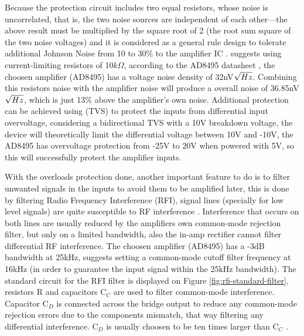 	Because the protection circuit includes two equal resistors, whose noise is uncorrelated, that is, the two noise sources are independent of each other—the above result must be multiplied by the square root of 2 (the root sum square of the two noise voltages) and it is considered as a general rule design to tolerate additional Johnson Noise from 10 to 30$\%$ to the amplifier IC \cite{sensors2000}. \cite{two-ways-thermocouple} suggests using current-limiting resistors of 10$k\Omega$, according to the AD8495 datasheet \cite{ad8495-datasheet}, the choosen amplifier (AD8495) has a voltage noise density of 32nV$\/ \sqrt{Hz}$. Combining this resistors noise with the amplifier noise will produce a overall noise of 36.85nV$\/\sqrt{Hz}$, which is just 13$\%$ above the amplifier's own noise. Additional protection can be achieved using (TVS) to protect the inputs from differential input overvoltage, considering a bidirectional TVS with a 10V breakdown voltage, the device will theoretically limit the differential voltage between 10V and -10V, the AD8495 has overvoltage protection from -25V to 20V when powered with 5V, so this will successfully protect the amplifier inputs. 
	\par
	With the overloads protection done, another important feature to do is to filter unwanted signals in the inputs to avoid them to be amplified later, this is done by filtering Radio Frequency Interference (RFI), signal lines (specially for low level signals) are quite susceptible to RF interference \cite{analogDevDesignersGuide}. Interference that occurs on both lines are usually reduced by the amplifiers own common-mode rejection filter, but only on a limited bandwidth, also the in-amp rectifier cannot filter differential RF interference. The choosen amplifier (AD8495) has a -3dB bandwidth at 25kHz, \cite{two-ways-thermocouple} suggests setting a common-mode cutoff filter frequency at 16kHz (in order to guarantee the input signal within the 25kHz bandwidth). The standard circuit for the RFI filter is displayed on Figure \ref{fig:rfi-standard-filter}, resistors R and capacitors C$_{C}$ are used to filter common-mode interference. Capacitor C$_{D}$ is connected across the bridge output to reduce any common-mode rejection errors due to the components mismatch, that way filtering any differential interference. C$_{D}$ is usually choosen to be ten times larger than C$_{C}$ \cite{ad8495-datasheet}.
	
